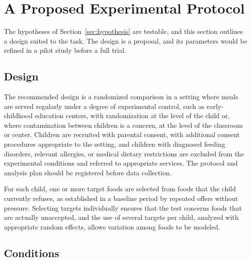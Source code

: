 \documentclass[11pt]{article}
\theoremstyle{remark}
\begin{document}
\section{A Proposed Experimental Protocol}\label{sec:protocol}

The hypotheses of Section~\ref{sec:hypothesis} are testable, and this section outlines a design suited to the task. The design is a proposal, and its parameters would be refined in a pilot study before a full trial.

\subsection{Design}

The recommended design is a randomized comparison in a setting where meals are served regularly under a degree of experimental control, such as early-childhood education centers, with randomization at the level of the child or, where contamination between children is a concern, at the level of the classroom or center. Children are recruited with parental consent, with additional consent procedures appropriate to the setting, and children with diagnosed feeding disorders, relevant allergies, or medical dietary restrictions are excluded from the experimental conditions and referred to appropriate services. The protocol and analysis plan should be registered before data collection.

For each child, one or more target foods are selected from foods that the child currently refuses, as established in a baseline period by repeated offers without pressure. Selecting targets individually ensures that the test concerns foods that are actually unaccepted, and the use of several targets per child, analyzed with appropriate random effects, allows variation among foods to be modeled.

\subsection{Conditions}
\end{document}
